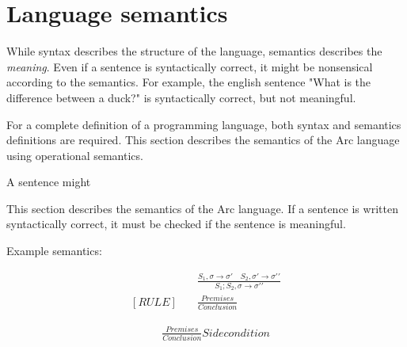\section{Language semantics}\label{sec:languagesemantics}
While syntax describes the structure of the language, semantics describes the \textit{meaning}. Even if a sentence is syntactically correct, it might be nonsensical according to the semantics. For example, the english sentence "What is the difference between a duck?" is syntactically correct, but not meaningful.

For a complete definition of a programming language, both syntax and semantics definitions are required. This section describes the semantics of the Arc language using operational semantics.



A sentence might 


This section describes the semantics of the Arc language. If a sentence is written syntactically correct, it must be checked if the sentence is meaningful. 

Example semantics:

\begin{align*}
    [COMPOSITION] \quad &
    \frac
    {S_1, \sigma \rightarrow \sigma \prime \quad S_2, \sigma \prime \rightarrow \sigma \prime \prime}
    {S_1;S_2, \sigma \rightarrow \sigma \prime \prime}
    \\
    [RULE]     \quad    &
    \frac
    {Premises}
    {Conclusion}
\end{align*}

\begin{align*}
    [RULE]     \quad &
    \frac
    {Premises}
    {Conclusion}
    Side condition
\end{align*}